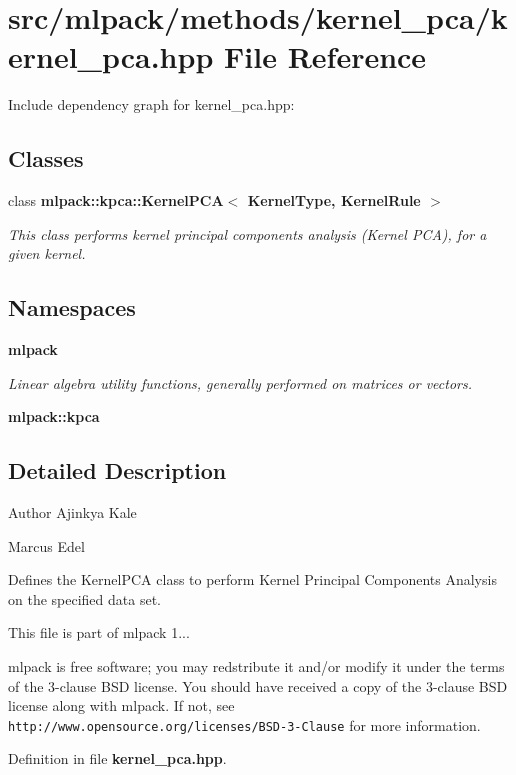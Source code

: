\section{src/mlpack/methods/kernel\-\_\-pca/kernel\-\_\-pca.hpp File Reference}
\label{kernel__pca_8hpp}
Include dependency graph for kernel\-\_\-pca.\-hpp\-:
\subsection*{Classes}
\begin{DoxyCompactItemize}
\item 
class {\bf mlpack\-::kpca\-::\-Kernel\-P\-C\-A$<$ Kernel\-Type, Kernel\-Rule $>$}
\begin{DoxyCompactList}\small\item\em This class performs kernel principal components analysis (Kernel P\-C\-A), for a given kernel. \end{DoxyCompactList}\end{DoxyCompactItemize}
\subsection*{Namespaces}
\begin{DoxyCompactItemize}
\item 
{\bf mlpack}
\begin{DoxyCompactList}\small\item\em Linear algebra utility functions, generally performed on matrices or vectors. \end{DoxyCompactList}\item 
{\bf mlpack\-::kpca}
\end{DoxyCompactItemize}


\subsection{Detailed Description}
\begin{DoxyAuthor}{Author}
Ajinkya Kale 

Marcus Edel
\end{DoxyAuthor}
Defines the Kernel\-P\-C\-A class to perform Kernel Principal Components Analysis on the specified data set.

This file is part of mlpack 1...

mlpack is free software; you may redstribute it and/or modify it under the terms of the 3-\/clause B\-S\-D license. You should have received a copy of the 3-\/clause B\-S\-D license along with mlpack. If not, see {\tt http\-://www.\-opensource.\-org/licenses/\-B\-S\-D-\/3-\/\-Clause} for more information. 

Definition in file {\bf kernel\-\_\-pca.\-hpp}.

